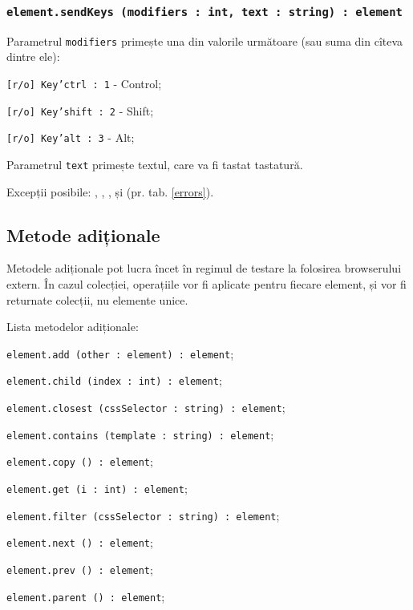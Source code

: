 \subsubsection{\texttt{element.sendKeys (modifiers : int, text : string) : element}}

Parametrul \texttt{modifiers} primește una din valorile următoare (sau suma din cîteva dintre ele):
\begin{icItems}
	\item \texttt{[r/o] Key'ctrl : 1} - Control;
	\item \texttt{[r/o] Key'shift : 2} - Shift;
	\item \texttt{[r/o] Key'alt : 3} - Alt;
\end{icItems}

Parametrul \texttt{text} primește textul, care va fi tastat tastatură.

Excepții posibile: , , ,   și  (pr. tab. \ref{errors}).

\subsection{Metode adiționale}

Metodele adiționale pot lucra încet în regimul de testare la folosirea browserului extern. În cazul colecției, operațiile vor fi aplicate pentru fiecare element, și vor fi returnate colecții, nu elemente unice. 

Lista metodelor adiționale:
\begin{icItems}
	\item \texttt{element.add (other : element) : element};
	\item \texttt{element.child (index : int) : element};
	\item \texttt{element.closest (cssSelector : string) : element};
	\item \texttt{element.contains (template : string) : element};
	\item \texttt{element.copy () : element};
	\item \texttt{element.get (i : int) : element};
	\item \texttt{element.filter (cssSelector : string) : element};
	\item \texttt{element.next () : element};
	\item \texttt{element.prev () : element};
	\item \texttt{element.parent () : element};
\end{icItems}

